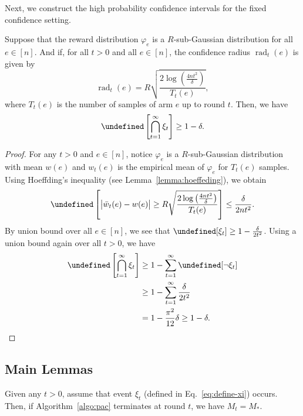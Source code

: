 \documentclass{article}
\newcommand{\Rew}{\varphi}
\DeclareMathOperator{\rad}{rad}
\let\Pr\undefined
\DeclareMathOperator{\Pr}{Pr}
\begin{document}
Next, we construct the high probability confidence intervals for the fixed confidence setting.
\begin{lemma}
\label{lemma:ci}
Suppose that the reward distribution $\Rew_e$ is a $R$-sub-Gaussian distribution for all $e\in [n]$.
And if, for all $t>0$ and all $e\in [n]$, 
the confidence radius $\rad_t(e)$ is given by
$$
\rad_t(e) = R\sqrt{\frac{2\log\left(\frac{4n t^2}\delta\right)}{T_t(e)}},
$$
where $T_t(e)$ is the number of samples of arm $e$ up to round $t$.
Then, we have
$$
\Pr\left[\bigcap_{t=1}^\infty \xi_t \right] \ge 1-\delta.
$$
\end{lemma}

\begin{proof}
For any $t>0$ and $e\in [n]$, notice $\Rew_e$ is a $R$-sub-Gaussian distribution with mean $w(e)$ and $w_t(e)$ is the empirical mean of $\Rew_e$ for $T_t(e)$ samples. 
Using Hoeffding's inequality (see Lemma~\ref{lemma:hoeffeding}), we obtain
$$
\Pr\left[ \big|\bar w_t(e)-w(e) \big| \ge R\sqrt{\frac{2\log\left(\frac{4n t^2}\delta\right)}{T_t(e)}} \right] \le \frac{\delta}{2nt^2}.
$$
By union bound over all $e\in [n]$, we see that $\Pr[\xi_t] \ge 1-\frac{\delta}{2t^2}$. 
Using a union bound again over all $t>0$, we have
\begin{align*}
\Pr\left[\bigcap_{t=1}^\infty \xi_t \right] &\ge 1-\sum_{t=1}^\infty \Pr[\neg \xi_t]\\
&\ge 1-\sum_{t=1}^\infty \frac{\delta}{2t^2}\\
&= 1-\frac{\pi^2}{12}\delta \ge 1-\delta.
\end{align*}
\end{proof}



\subsection{Main Lemmas}

\begin{lemma}
\label{lemma:correct}
Given any $t > 0$, assume that event $\xi_t$ (defined in Eq.~\eqref{eq:define-xi}) occurs.
Then, if Algorithm~\ref{algo:pac} terminates at round $t$, we have $M_t=M_*$.
\end{lemma}
\end{document}
